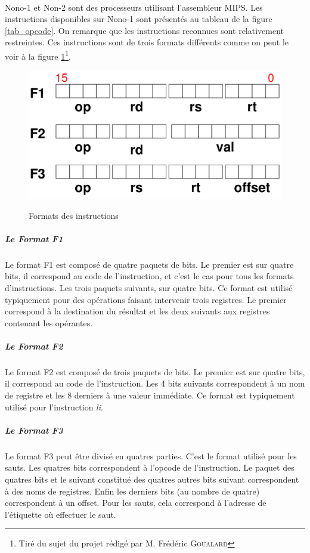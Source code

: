 \documentclass[a4paper]{article}
\begin{document}
			\paragraph{}{
			Nono-1 et Non-2 sont des processeurs utilisant l'assembleur MIPS. Les 
			instructions disponibles sur Nono-1 sont présentés au tableau de la figure
			\ref{tab_opcode}. On remarque que les instructions reconnues sont relativement
			restreintes. Ces instructions sont de trois formats différents comme on peut
			le voir à la figure \ref{format_inst}\footnote{Tiré du sujet du projet rédigé par M. Frédéric \textsc{Goualard}}.
			}
			
			\begin{figure}[!ht]
			\centering
			\includegraphics[scale=0.2]{formats_instructions.png}
			\label{format_inst}
			\caption{Formats des instructions}
			\end{figure}
			
				\subparagraph{Le Format F1}{
				Le format F1 est composé de quatre paquets de bits.
				Le premier est sur quatre bits, il correspond au code de l'instruction,
				et c'est le cas pour tous les formats d'instructions.
				Les trois paquets suivants, sur quatre bits. Ce format est utilisé typiquement
				pour des opérations faisant intervenir trois registres. Le premier correspond
				à la destination du résultat et les deux suivants aux registres contenant les
				opérantes.
				}
				\subparagraph{Le Format F2}{
				Le format F2 est composé de trois paquets de bits.
				Le premier est sur quatre bits, il correspond au code de l'instruction.
				Les 4 bits suivants correspondent à un nom de registre et les 8 derniers
				à une valeur immédiate. Ce format est typiquement utilisé pour l'instruction
				\textit{li}.
				}
				\subparagraph{Le Format F3}{
				Le format F3 peut être divisé en quatres parties. C'est le format utilisé
				pour les sauts. Les quatres bits correspondent à l'opcode de l'instruction.
				Le paquet des quatres bits et le suivant constitué des quatres autres bits
				suivant correspondent à des noms de registres. Enfin les derniers bits (au
				nombre de quatre) correspondent à un offset. Pour les sauts, cela correspond
				à l'adresse de l'étiquette où effectuer le saut. 
				}
			
\end{document}
